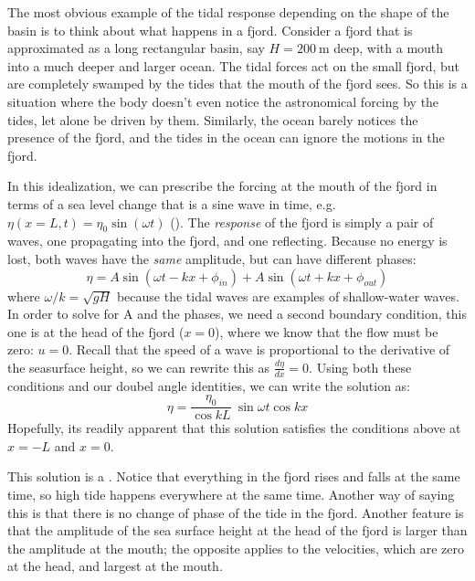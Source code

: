 The most obvious example of the tidal response depending on the shape of the basin is to think about what happens in a fjord.  Consider a fjord that is approximated as a long rectangular basin, say $H=200\ \mathrm{m}$ deep,   with a mouth into a much deeper and larger ocean.  The tidal forces act on the small fjord, but are completely swamped by the tides that the mouth of the fjord sees.  So this is a situation where the body doesn't even notice the astronomical forcing by the tides, let alone be driven by them.  Similarly, the ocean barely notices the presence of the fjord, and the tides in the ocean can ignore the motions in the fjord. 

In this idealization, we can prescribe the forcing at the mouth of the fjord in terms of a sea level change that is a sine wave in time, e.g. $\eta(x=L, t) = \eta_0 \sin(\omega t)$ ().  The \emph{response} of the fjord is simply a pair of waves, one propagating into the fjord, and one reflecting.  Because no energy is lost, both waves have the \emph{same} amplitude, but can have different phases:
\begin{equation}
    \eta = A \sin(\omega t - k x + \phi_{in}) + A \sin(\omega t + k x +\phi_{out})
\end{equation}  
where $\omega/k = \sqrt{gH}$ because the tidal waves are examples of shallow-water waves.  In order to solve for A and the phases, we need a second boundary condition, this one is at the head of the fjord ($x=0$), where we know that the flow must be zero: $u=0$.  Recall that the speed of a wave is proportional to the derivative of the seasurface height, so we can rewrite this as $\frac{d\eta}{dx} = 0$.  Using both these conditions and our doubel angle identities, we can write the solution as:
\begin{equation}
    \eta = \frac{\eta_0}{ \cos kL}\ \sin \omega t \cos kx
\end{equation}
Hopefully, its readily apparent that this solution satisfies the conditions above at $x=-L$ and $x=0$.  

This solution is a .  Notice that everything in the fjord rises and falls at the same time, so high tide happens everywhere at the same time.  Another way of saying this is that there is no change of phase of the tide in the fjord.  Another feature is that the amplitude of the sea surface height at the head of the fjord is larger than the amplitude at the mouth; the opposite applies to the velocities, which are zero at the head, and largest at the mouth.  

